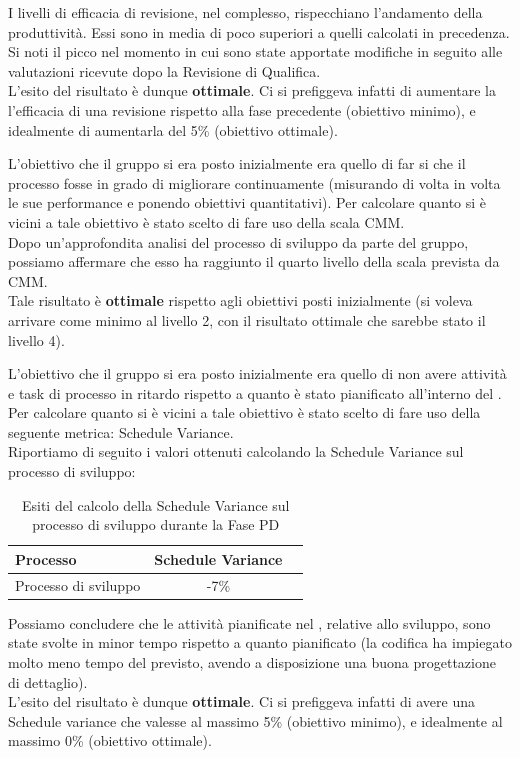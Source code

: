 				I livelli di efficacia di revisione, nel complesso, rispecchiano l'andamento della produttività. Essi sono in media di poco superiori a quelli calcolati in precedenza. Si noti il picco nel momento in cui sono state apportate modifiche in seguito alle valutazioni ricevute dopo la Revisione di Qualifica.\\
				L'esito del risultato è dunque \textbf{ottimale}. Ci si prefiggeva infatti di aumentare la l'efficacia di una revisione rispetto alla fase precedente (obiettivo minimo), e idealmente di aumentarla del 5\% (obiettivo ottimale).

				L'obiettivo che il gruppo si era posto inizialmente era quello di far si che il processo fosse in grado di migliorare continuamente (misurando di volta in volta le sue performance e ponendo obiettivi quantitativi). Per calcolare quanto si è vicini a tale obiettivo è stato scelto di fare uso della scala CMM.\\
				Dopo un'approfondita analisi del processo di sviluppo da parte del gruppo, possiamo affermare che esso ha raggiunto il quarto livello della scala prevista da CMM.\\
				Tale risultato è \textbf{ottimale} rispetto agli obiettivi posti inizialmente (si voleva arrivare come minimo al livello 2, con il risultato ottimale che sarebbe stato il livello 4).
			
				L'obiettivo che il gruppo si era posto inizialmente era quello di non avere attività e task di processo in ritardo rispetto a quanto è stato pianificato all'interno del . Per calcolare quanto si è vicini a tale obiettivo è stato scelto di fare uso della seguente metrica: Schedule Variance.\\
				Riportiamo di seguito i valori ottenuti calcolando la Schedule Variance sul processo di sviluppo:
				\begin{table}[H]
					\centering
					\begin{tabu}{| l | c | c |}
						\hline
						Processo 			   & Schedule Variance   \\ \hline \hline
						Processo di sviluppo   & -7\%                \\ \hline
					\end{tabu}
					\caption{Esiti del calcolo della Schedule Variance sul processo di sviluppo durante la Fase PD}
				\end{table}
				Possiamo concludere che le attività pianificate nel , relative allo sviluppo, sono state svolte in minor tempo rispetto a quanto pianificato (la codifica ha impiegato molto meno tempo del previsto, avendo a disposizione una buona progettazione di dettaglio).\\
				L'esito del risultato è dunque \textbf{ottimale}. Ci si prefiggeva infatti di avere una Schedule variance che valesse al massimo 5\% (obiettivo minimo), e idealmente al massimo 0\% (obiettivo ottimale).
						

